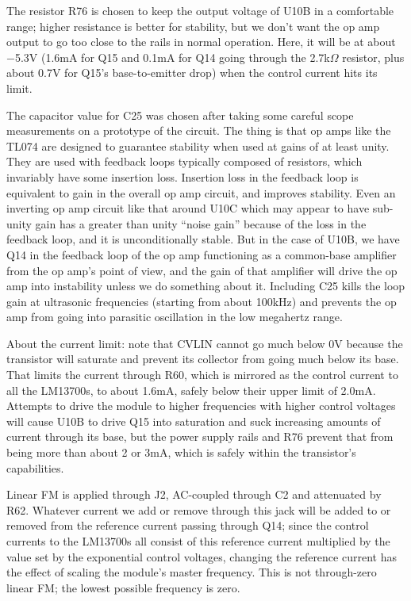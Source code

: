 The resistor R76 is chosen to keep the output voltage of U10B in a
comfortable range; higher resistance is better for stability, but we don't
want the op amp output to go too close to the rails in normal operation. 
Here, it will be at about $-$5.3V (1.6mA for Q15 and 0.1mA for Q14 going
through the 2.7k$\Omega$ resistor, plus about 0.7V for Q15's
base-to-emitter drop) when the control current hits its limit.

The capacitor value for C25 was chosen after taking some careful scope
measurements on a prototype of the circuit.  The thing is that op amps like
the TL074 are designed to guarantee stability when used at gains of at least
unity.  They are used with feedback loops typically composed of resistors,
which invariably have some insertion loss.  Insertion loss in the feedback
loop is equivalent to gain in the overall op amp circuit, and improves
stability.  Even an inverting op amp circuit like that around U10C which may
appear to have sub-unity gain has a greater than unity ``noise gain''
because of the loss in the feedback loop, and it is unconditionally stable. 
But in the case of U10B, we have Q14 in the feedback loop of the op amp
functioning as a common-base amplifier from the op amp's point of view, and
the gain of that amplifier will drive the op amp into instability unless we
do something about it.  Including C25 kills the loop gain at ultrasonic
frequencies (starting from about 100kHz) and prevents the op amp from going
into parasitic oscillation in the low megahertz range.

About the current limit:  note that CVLIN cannot go much below 0V because
the transistor will saturate and prevent its collector from going much below
its base.  That limits the current through R60, which is mirrored as the
control current to all the LM13700s, to about 1.6mA, safely below their
upper limit of 2.0mA.  Attempts to drive the module to higher frequencies
with higher control voltages will cause U10B to drive Q15 into
saturation and suck increasing amounts of current through its base, but the
power supply rails and R76 prevent that from being more than about 2 or 3mA,
which is safely within the transistor's capabilities.

Linear FM is applied through J2, AC-coupled through C2 and attenuated by
R62.  Whatever current we add or remove through this jack will be added to
or removed from the reference current passing through Q14; since the control
currents to the LM13700s all consist of this reference current multiplied by
the value set by the exponential control voltages, changing the reference
current has the effect of scaling the module's master frequency.  This is
not through-zero linear FM; the lowest possible frequency is zero.

